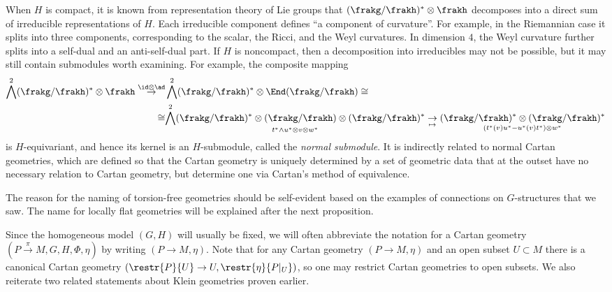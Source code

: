 \begin{example}
    When $H$ is compact, it is known from representation theory of Lie groups that $(\frakg\slash\frakh)^\ast\otimes\frakh$ decomposes into a direct sum of irreducible representations of $H$. Each irreducible component defines ``a component of curvature''. For example, in the Riemannian case it splits into three components, corresponding to the scalar, the Ricci, and the Weyl curvatures. In dimension $4$, the Weyl curvature further splits into a self-dual and an anti-self-dual part. If $H$ is noncompact, then a decomposition into irreducibles may not be possible, but it may still contain submodules worth examining. For example, the composite mapping 
    \begin{align}
        \bigwedge^2(\frakg\slash\frakh)^\ast\otimes\frakh\overset{\id\otimes \ad}{\to}&\bigwedge^2(\frakg\slash\frakh)^\ast\otimes\End(\frakg\slash\frakh)\cong \notag\\
        \cong &\underset{t^\ast\wedge u^\ast\otimes v\otimes w^\ast}{\bigwedge^2(\frakg\slash\frakh)^\ast\otimes(\frakg\slash\frakh)\otimes (\frakg\slash\frakh)^\ast}
        \underset{\mapsto}{\to} \underset{(t^\ast(v)u^\ast-u^\ast(v)t^\ast)\otimes w^\ast}{(\frakg\slash\frakh)^\ast\otimes (\frakg\slash\frakh)^\ast}
    \end{align}
    is $H$-equivariant, and hence its kernel is an $H$-submodule, called the \emph{normal submodule}. It is indirectly related to normal Cartan geometries, which are defined so that the Cartan geometry is uniquely determined by a set of geometric data that at the outset have no necessary relation to Cartan geometry, but determine one via Cartan's method of equivalence.
\end{example}

The reason for the naming of torsion-free geometries should be self-evident based on the examples of connections on $G$-structures that we saw. The name for locally flat geometries will be explained after the next proposition.

Since the homogeneous model $(G,H)$ will usually be fixed, we will often abbreviate the notation for a Cartan geometry $(P\overset{\pi}{\to} M,G,H,\Phi,\eta)$ by writing $(P\to M,\eta)$. Note that for any Cartan geometry $(P\to M,\eta)$ and an open subset $U\subset M$ there is a canonical Cartan geometry $\left(\restr{P}{U}\to U,\restr{\eta}{P|_U}\right)$, so one may restrict Cartan geometries to open subsets. We also reiterate two related statements about Klein geometries proven earlier.

